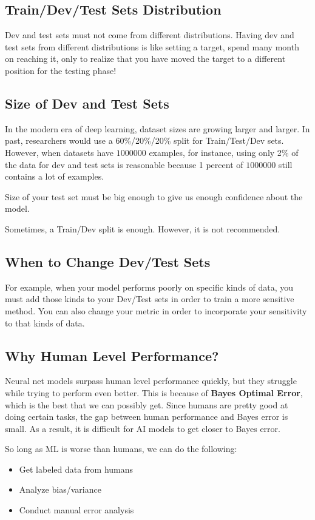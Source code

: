 \subsection{Train/Dev/Test Sets Distribution}
Dev and test sets must not come from different distributions. 
Having dev and test sets from different distributions is like setting a target, 
spend many month on reaching it, only to realize that you have moved the target
to a different position for the testing phase!

\subsection{Size of Dev and Test Sets}
In the modern era of deep learning, dataset sizes are growing larger and larger. 
In past, researchers would use a 60\%/20\%/20\% split for Train/Test/Dev sets. 
However, when datasets have $1000000$ examples, for instance, using only 2\% of the data for 
dev and test sets is reasonable because 1 percent of $1000000$ still contains a lot of examples.

Size of your test set must be big enough to give us enough 
confidence about the model. 

Sometimes, a Train/Dev split is enough. However, it is not recommended. 

\subsection{When to Change Dev/Test Sets}
For example, when your model performs poorly on specific kinds of data, you 
must add those kinds to your Dev/Test sets in order to train a more sensitive method.
You can also change your metric in order to incorporate your sensitivity to that kinds of data. 


\subsection{Why Human Level Performance?}
Neural net models surpass human level performance quickly, but they struggle while trying to perform even better.
This is because of \textbf{Bayes Optimal Error}, which is the best that we can possibly get. 
Since humans are pretty good at doing certain tasks, the gap between human performance and Bayes error is small.
As a result, it is difficult for AI models to get closer to Bayes error. 

So long as ML is worse than humans, we can do the following: 
\begin{itemize}
    \item Get labeled data from humans
    \item Analyze bias/variance 
    \item Conduct manual error analysis
\end{itemize}

